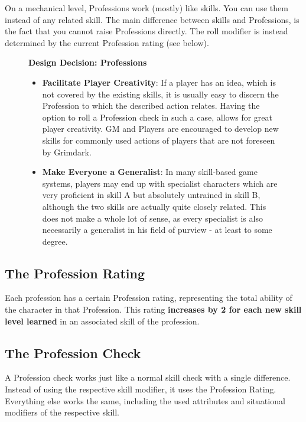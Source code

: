 On a mechanical level, Professions work (mostly) like skills.
You can use them instead of any related skill.
The main difference between skills and Professions, is the fact that you cannot raise Professions directly.
The roll modifier is instead determined by the current Profession rating (see below).

\begin{figure}[hb]
	\begin{DndReadAloud}
	\textbf{Design Decision: Professions}
	\begin{itemize}
		\item \textbf{Facilitate Player Creativity}: If a player has an idea, which is not covered by the existing skills, it is usually easy to discern the Profession to which the described action relates. Having the option to roll a Profession check in such a case, allows for great player creativity. GM and Players are encouraged to develop new skills for commonly used actions of players that are not foreseen by Grimdark.
		\item \textbf{Make Everyone a Generalist}: In many skill-based game systems, players may end up with specialist characters which are very proficient in skill A but absolutely untrained in skill B, although the two skills are actually quite closely related. This does not make a whole lot of sense, as every specialist is also necessarily a generalist in his field of purview - at least to some degree.
		\end{itemize}
	\end{DndReadAloud}
\end{figure}

\subsection{The Profession Rating}
Each profession has a certain Profession rating, representing the total ability of the character in that Profession. 
This rating \textbf{increases by 2 for each new skill level learned} in an associated skill of the profession.

\subsection{The Profession Check}
A Profession check works just like a normal skill check with a single difference.
Instead of using the respective skill modifier, it uses the Profession Rating.
Everything else works the same, including the used attributes and situational modifiers of the respective skill.

